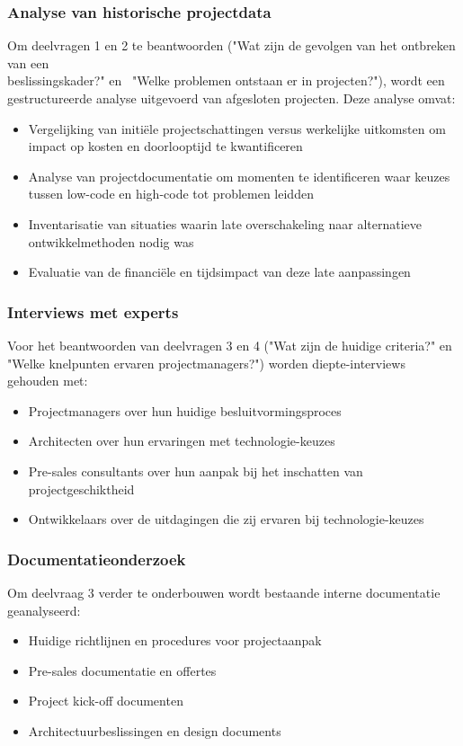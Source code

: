 \subsubsection{Analyse van historische projectdata}
Om deelvragen 1 en 2 te beantwoorden ("Wat zijn de gevolgen van het ontbreken van een \\ beslissingskader?" \; \hbox{en} \, "Welke problemen ontstaan er in projecten?"), wordt een gestructureerde analyse uitgevoerd van afgesloten projecten. Deze analyse omvat:
\begin{itemize}
    \item Vergelijking van initiële projectschattingen versus werkelijke uitkomsten om impact op kosten en doorlooptijd te kwantificeren
    \item Analyse van projectdocumentatie om momenten te identificeren waar keuzes tussen low-code en high-code tot problemen leidden
    \item Inventarisatie van situaties waarin late overschakeling naar alternatieve ontwikkelmethoden nodig was
    \item Evaluatie van de financiële en tijdsimpact van deze late aanpassingen
\end{itemize}
\subsubsection{Interviews met experts}
Voor het beantwoorden van deelvragen 3 en 4 ("Wat zijn de huidige criteria?" \; \hbox{en} \, "Welke knelpunten ervaren projectmanagers?") worden diepte-interviews gehouden met:
\begin{itemize}
    \item Projectmanagers over hun huidige besluitvormingsproces
    \item Architecten over hun ervaringen met technologie-keuzes
    \item Pre-sales consultants over hun aanpak bij het inschatten van projectgeschiktheid
    \item Ontwikkelaars over de uitdagingen die zij ervaren bij technologie-keuzes
\end{itemize}
\subsubsection{Documentatieonderzoek}
Om deelvraag 3 verder te onderbouwen wordt bestaande interne documentatie geanalyseerd:
\begin{itemize}
    \item Huidige richtlijnen en procedures voor projectaanpak
    \item Pre-sales documentatie en offertes
    \item Project kick-off documenten
    \item Architectuurbeslissingen en design documents
\end{itemize}
